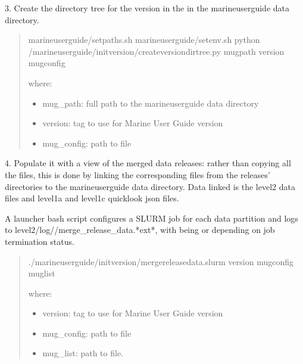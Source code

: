 \documentclass[letterpaper,10pt,english]{sphinxmanual}
\begin{document}
3. Create the directory tree for the version in the  in the marine\sphinxhyphen{}user\sphinxhyphen{}guide data directory.
\begin{quote}

\begin{sphinxVerbatim}[commandchars=\\\{\}]
 marine\PYGZhy{}user\PYGZhy{}guide/setpaths.sh
 marine\PYGZhy{}user\PYGZhy{}guide/setenv.sh
python /marine\PYGZhy{}user\PYGZhy{}guide/init\PYGZus{}version/create\PYGZus{}version\PYGZus{}dir\PYGZus{}tree.py mug\PYGZus{}path version mug\PYGZus{}config
\end{sphinxVerbatim}

where:
\begin{itemize}
\item {} 
mug\_path: full path to the marine\sphinxhyphen{}user\sphinxhyphen{}guide data directory

\item {} 
version: tag to use for Marine User Guide version

\item {} 
mug\_config: path to  file

\end{itemize}
\end{quote}

4. Populate it with a view of the merged data releases: rather than copying all the files, this is done by linking the corresponding files from the releases’ directories to the marine\sphinxhyphen{}user\sphinxhyphen{}guide data directory. Data linked is the level2 data files and level1a and level1c quicklook json files.

A launcher bash script configures a SLURM job for each  data partition
and logs to level2/log//merge\_release\_data.*ext*, with  being  or
 depending on job termination status.
\begin{quote}

\begin{sphinxVerbatim}[commandchars=\\\{\}]
./marine\PYGZhy{}user\PYGZhy{}guide/init\PYGZus{}version/merge\PYGZus{}release\PYGZus{}data.slurm version mug\PYGZus{}config mug\PYGZus{}list
\end{sphinxVerbatim}

where:
\begin{itemize}
\item {} 
version: tag to use for Marine User Guide version

\item {} 
mug\_config: path to  file

\item {} 
mug\_list: path to  file.

\end{itemize}
\end{quote}
\end{document}
